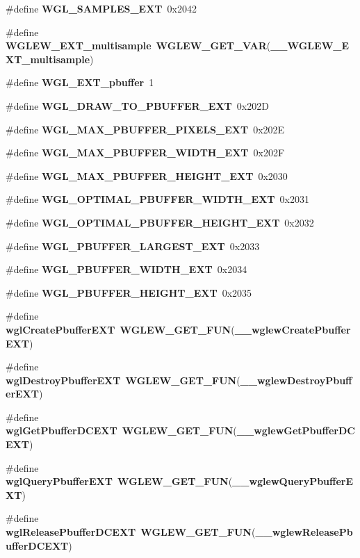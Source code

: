 \begin{DoxyCompactItemize}
\#define {\bf W\+G\+L\+\_\+\+S\+A\+M\+P\+L\+E\+S\+\_\+\+E\+XT}~0x2042
\item 
\#define {\bf W\+G\+L\+E\+W\+\_\+\+E\+X\+T\+\_\+multisample}~{\bf W\+G\+L\+E\+W\+\_\+\+G\+E\+T\+\_\+\+V\+AR}({\bf \+\_\+\+\_\+\+W\+G\+L\+E\+W\+\_\+\+E\+X\+T\+\_\+multisample})
\item 
\#define {\bf W\+G\+L\+\_\+\+E\+X\+T\+\_\+pbuffer}~1
\item 
\#define {\bf W\+G\+L\+\_\+\+D\+R\+A\+W\+\_\+\+T\+O\+\_\+\+P\+B\+U\+F\+F\+E\+R\+\_\+\+E\+XT}~0x202D
\item 
\#define {\bf W\+G\+L\+\_\+\+M\+A\+X\+\_\+\+P\+B\+U\+F\+F\+E\+R\+\_\+\+P\+I\+X\+E\+L\+S\+\_\+\+E\+XT}~0x202E
\item 
\#define {\bf W\+G\+L\+\_\+\+M\+A\+X\+\_\+\+P\+B\+U\+F\+F\+E\+R\+\_\+\+W\+I\+D\+T\+H\+\_\+\+E\+XT}~0x202F
\item 
\#define {\bf W\+G\+L\+\_\+\+M\+A\+X\+\_\+\+P\+B\+U\+F\+F\+E\+R\+\_\+\+H\+E\+I\+G\+H\+T\+\_\+\+E\+XT}~0x2030
\item 
\#define {\bf W\+G\+L\+\_\+\+O\+P\+T\+I\+M\+A\+L\+\_\+\+P\+B\+U\+F\+F\+E\+R\+\_\+\+W\+I\+D\+T\+H\+\_\+\+E\+XT}~0x2031
\item 
\#define {\bf W\+G\+L\+\_\+\+O\+P\+T\+I\+M\+A\+L\+\_\+\+P\+B\+U\+F\+F\+E\+R\+\_\+\+H\+E\+I\+G\+H\+T\+\_\+\+E\+XT}~0x2032
\item 
\#define {\bf W\+G\+L\+\_\+\+P\+B\+U\+F\+F\+E\+R\+\_\+\+L\+A\+R\+G\+E\+S\+T\+\_\+\+E\+XT}~0x2033
\item 
\#define {\bf W\+G\+L\+\_\+\+P\+B\+U\+F\+F\+E\+R\+\_\+\+W\+I\+D\+T\+H\+\_\+\+E\+XT}~0x2034
\item 
\#define {\bf W\+G\+L\+\_\+\+P\+B\+U\+F\+F\+E\+R\+\_\+\+H\+E\+I\+G\+H\+T\+\_\+\+E\+XT}~0x2035
\item 
\#define {\bf wgl\+Create\+Pbuffer\+E\+XT}~{\bf W\+G\+L\+E\+W\+\_\+\+G\+E\+T\+\_\+\+F\+UN}({\bf \+\_\+\+\_\+wglew\+Create\+Pbuffer\+E\+XT})
\item 
\#define {\bf wgl\+Destroy\+Pbuffer\+E\+XT}~{\bf W\+G\+L\+E\+W\+\_\+\+G\+E\+T\+\_\+\+F\+UN}({\bf \+\_\+\+\_\+wglew\+Destroy\+Pbuffer\+E\+XT})
\item 
\#define {\bf wgl\+Get\+Pbuffer\+D\+C\+E\+XT}~{\bf W\+G\+L\+E\+W\+\_\+\+G\+E\+T\+\_\+\+F\+UN}({\bf \+\_\+\+\_\+wglew\+Get\+Pbuffer\+D\+C\+E\+XT})
\item 
\#define {\bf wgl\+Query\+Pbuffer\+E\+XT}~{\bf W\+G\+L\+E\+W\+\_\+\+G\+E\+T\+\_\+\+F\+UN}({\bf \+\_\+\+\_\+wglew\+Query\+Pbuffer\+E\+XT})
\item 
\#define {\bf wgl\+Release\+Pbuffer\+D\+C\+E\+XT}~{\bf W\+G\+L\+E\+W\+\_\+\+G\+E\+T\+\_\+\+F\+UN}({\bf \+\_\+\+\_\+wglew\+Release\+Pbuffer\+D\+C\+E\+XT})

\end{DoxyCompactItemize}
